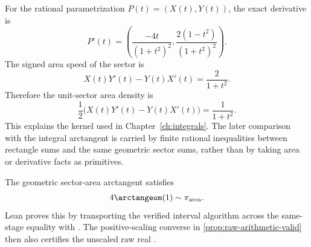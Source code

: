 \begin{theorem}
\label{thm:sector-area-density}
\leanok
For the rational parametrization \(P(t)=(X(t),Y(t))\), the exact derivative is
\[
  P'(t)=
  \left(
    \frac{-4t}{(1+t^2)^2},
    \frac{2(1-t^2)}{(1+t^2)^2}
  \right).
\]
The signed area speed of the sector is
\[
  X(t)Y'(t)-Y(t)X'(t)=\frac{2}{1+t^2}.
\]
Therefore the unit-sector area density is
\[
  \frac12\bigl(X(t)Y'(t)-Y(t)X'(t)\bigr)
  =
  \frac{1}{1+t^2}.
\]
This explains the kernel used in Chapter~\ref{ch:integrals}.  The later
comparison with the integral arctangent is carried by finite rational
inequalities between rectangle sums and the same geometric sector sums, rather
than by taking area or derivative facts as primitives.
\end{theorem}

\begin{theorem}
\label{thm:geometric-arctan-one-area-pi}
The geometric sector-area arctangent satisfies
\[
  4\arctangeom(1)\sim \pi_{\mathrm{area}}.
\]
Lean proves this by transporting the verified  interval
algorithm across the same-stage equality with .
The positive-scaling converse in \cref{prop:raw-arithmetic-valid} then also
certifies the unscaled raw real .
\end{theorem}

